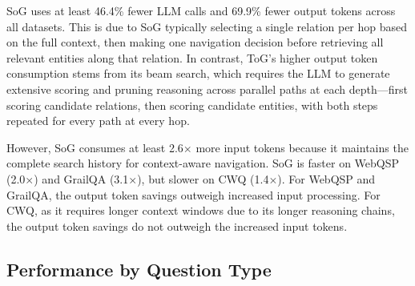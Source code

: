 \documentclass[sigconf]{acmart}
\begin{document}
\begin{table}[t]
\centering
\caption{Efficiency comparison between SoG and ToG using GPT-4o. All metrics are averaged per question.}
\label{tab:efficiency}
\end{table}

SoG uses at least 46.4\% fewer LLM calls and 69.9\% fewer output tokens across all datasets. This is due to SoG typically selecting a single relation per hop based on the full context, then making one navigation decision before retrieving all relevant entities along that relation. In contrast, ToG's higher output token consumption stems from its beam search, which requires the LLM to generate extensive scoring and pruning reasoning across parallel paths at each depth---first scoring candidate relations, then scoring candidate entities, with both steps repeated for every path at every hop. 

However, SoG consumes at least 2.6$\times$ more input tokens because it maintains the complete search history for context-aware navigation. SoG is faster on WebQSP (2.0$\times$) and GrailQA (3.1$\times$), but slower on CWQ (1.4$\times$). For WebQSP and GrailQA, the output token savings outweigh increased input processing. For CWQ, as it requires longer context windows due to its longer reasoning chains, the output token savings do not outweigh the increased input tokens.


\subsection{Performance by Question Type}
\label{sec:question_type}
\end{document}
